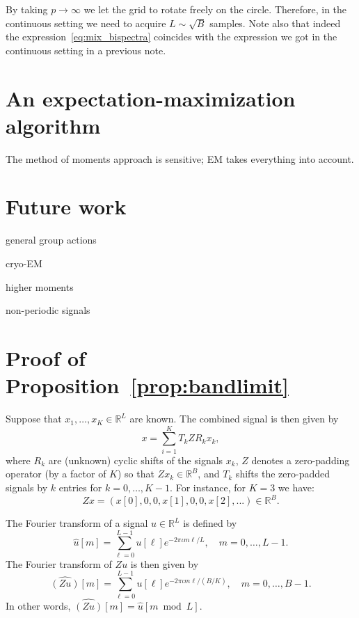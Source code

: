 \documentclass[english,12pt]{article}
\newcommand{\I}{\iota}
\newcommand{\R}{\mathbb{R}}
\numberwithin{equation}{section}
\numberwithin{mytheorem}{section} %
\begin{document}
By taking $p\to\infty$ we let the grid to rotate freely on the circle. Therefore, in the continuous setting we need to acquire $L\sim\sqrt{B}$ samples. Note also that indeed the expression~\eqref{eq:mix_bispectra} coincides with the expression we got in the continuous setting in a previous note.

\section{An expectation-maximization algorithm}

The method of moments approach is sensitive; EM takes everything into account.

\section{Future work}
general group actions

cryo-EM

higher moments

non-periodic signals 

	
	




\appendix

\section{Proof of Proposition~\ref{prop:bandlimit}}
Suppose that $x_1,\ldots,x_K\in\R^L$ are known.
The combined signal is then given by 
\begin{equation}
x = \sum_{i=1}^K T_kZR_kx_k,
\end{equation}
where $R_k$ are (unknown) cyclic shifts of the signals $x_k$, $Z$ denotes a zero-padding operator (by a factor of $K$) so that $Zx_k\in\mathbb{R}^B$, and $T_k$ shifts the zero-padded signals by $k$ entries for $k=0,\ldots, K-1$. 
For instance, for $K=3$ we have: 
\begin{equation}
Zx = (x[0],0,0,x[1],0,0,x[2],...)\in\mathbb{R}^B.
\end{equation}

The Fourier transform of a signal $u\in\mathbb{R}^{L}$ is defined by 
\begin{equation}
\hat{u}[m]=\sum_{\ell=0}^{L-1}u[\ell]e^{-2\pi\I m\ell /L}, \quad m=0,\ldots,L-1. 
\end{equation}
The Fourier transform of $Zu$ is then given by 
\begin{equation}
\widehat{(Zu)}[m] = \sum_{\ell=0}^{L-1}u[\ell]e^{-2\pi\I m\ell /(B/K)}, \quad m=0,\ldots,B-1.
\end{equation}
In other words, $\widehat{(Zu)}[m] = \hat{u}[m\bmod L]$.
\end{document}
